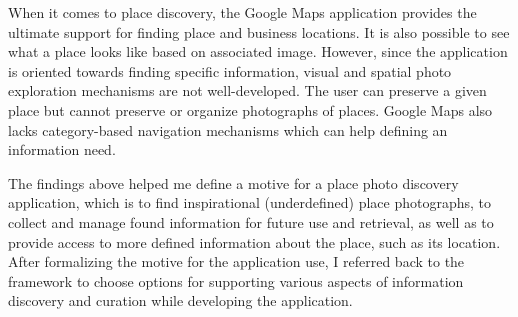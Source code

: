 {When it comes to place discovery, the Google Maps application provides the ultimate support for finding place and business locations. It is also possible to see what a place looks like based on associated image. However, since the application is oriented towards finding specific information, visual and spatial photo exploration mechanisms are not well-developed. The user can preserve a given place but cannot preserve or organize photographs of places. Google Maps also lacks category-based navigation mechanisms which can help defining an information need.  

The findings above helped me define a motive for a place photo discovery application, which is to find inspirational (underdefined) place photographs, to collect and manage found information for future use and retrieval, as well as to provide access to more defined information about the place, such as its location. After formalizing the motive for the application use, I referred back to the framework to choose options for supporting various aspects of information discovery and curation while developing the application.
}

